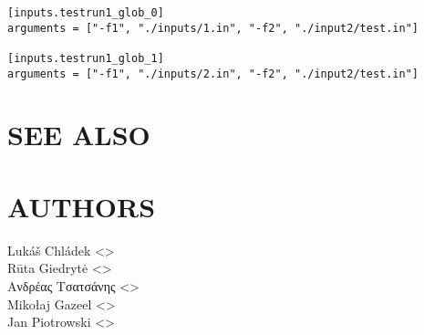 \documentclass[a4paper,english]{article}
\begin{document}
\begin{adjustwidth}{18pt}{0pt}
      \begin{verbatim}
[inputs.testrun1_glob_0]
arguments = ["-f1", "./inputs/1.in", "-f2", "./input2/test.in"]

[inputs.testrun1_glob_1]
arguments = ["-f1", "./inputs/2.in", "-f2", "./input2/test.in"]
      \end{verbatim}


  \section{SEE ALSO}

  \section{AUTHORS}
    Lukáš Chládek <>\\[0.1cm]\MANbr
    Rūta Giedrytė <>\\[0.1cm]\MANbr
    Ανδρέας Τσατσάνης <>\\[0.1cm]\MANbr
    Mikołaj Gazeel <>\\[0.1cm]\MANbr
    Jan Piotrowski <>
\end{adjustwidth}
\end{document}
